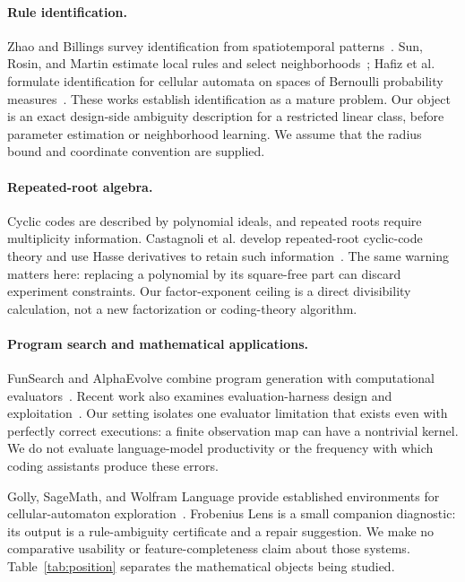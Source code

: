 \documentclass{ijuc}
\begin{document}
\paragraph{Rule identification.}
Zhao and Billings survey identification from spatiotemporal patterns~\cite{zhao2006}. Sun, Rosin, and Martin estimate local rules and select neighborhoods~\cite{sun2011}; Hafiz et al. formulate identification for cellular automata on spaces of Bernoulli probability measures~\cite{hafiz2025}. These works establish identification as a mature problem. Our object is an exact design-side ambiguity description for a restricted linear class, before parameter estimation or neighborhood learning. We assume that the radius bound and coordinate convention are supplied.

\paragraph{Repeated-root algebra.}
Cyclic codes are described by polynomial ideals, and repeated roots require multiplicity information. Castagnoli et al. develop repeated-root cyclic-code theory and use Hasse derivatives to retain such information~\cite{castagnoli1991}. The same warning matters here: replacing a polynomial by its square-free part can discard experiment constraints. Our factor-exponent ceiling is a direct divisibility calculation, not a new factorization or coding-theory algorithm.

\paragraph{Program search and mathematical applications.}
FunSearch and AlphaEvolve combine program generation with computational evaluators~\cite{funsearch,alphaevolve}. Recent work also examines evaluation-harness design and exploitation~\cite{harness2026}. Our setting isolates one evaluator limitation that exists even with perfectly correct executions: a finite observation map can have a nontrivial kernel. We do not evaluate language-model productivity or the frequency with which coding assistants produce these errors.

Golly, SageMath, and Wolfram Language provide established environments for cellular-automaton exploration~\cite{golly,sage,wolfram}. Frobenius Lens is a small companion diagnostic: its output is a rule-ambiguity certificate and a repair suggestion. We make no comparative usability or feature-completeness claim about those systems. Table~\ref{tab:position} separates the mathematical objects being studied.
\end{document}
